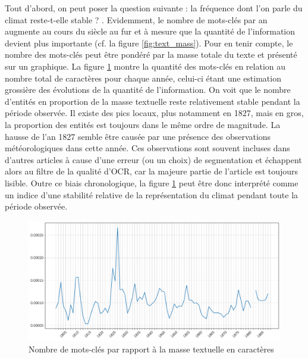 \documentclass[a4paper,twoside,12pt]{article}
\begin{document}
Tout d'abord, on peut poser la question suivante : \og la fréquence dont l'on parle du climat reste-t-elle stable ? \fg{}. Evidemment, le nombre de mots-clés par an augmente au cours du siècle au fur et à mesure que la quantité de l'information devient plus importante (cf. la figure \ref{fig:text_mass}). Pour en tenir compte, le nombre des mots-clés peut être pondéré par la masse totale du texte et présenté sur un graphique. La figure \ref{fig:entities_per_mass} montre la quantité des mots-clés en relation au nombre total de caractères pour chaque année, celui-ci étant une estimation grossière des évolutions de la quantité de l'information. On voit que le nombre d'entités en proportion de la masse textuelle reste relativement stable pendant la période observée. Il existe des pics locaux, plus notamment en 1827, mais en gros, la proportion des entités est toujours dans le même ordre de magnitude. La hausse de l'an 1827 semble être causée par une présence des observations météorologiques dans cette année. Ces observations sont souvent incluses dans d'autres articles à cause d'une erreur (ou un choix) de segmentation et échappent alors au filtre de la qualité d'OCR, car la majeure partie de l'article est toujours lisible. Outre ce biais chronologique, la figure \ref{fig:entities_per_mass} peut être donc interprété comme un indice d'une stabilité relative de la représentation du climat pendant toute la période observée.

\begin{figure}[h]
    \centering
    \includegraphics[width=\textwidth]{images/entities_per_mass.pdf}
    \caption{Nombre de mots-clés par rapport à la masse textuelle en caractères}
    \label{fig:entities_per_mass}
\end{figure}


\end{document}
